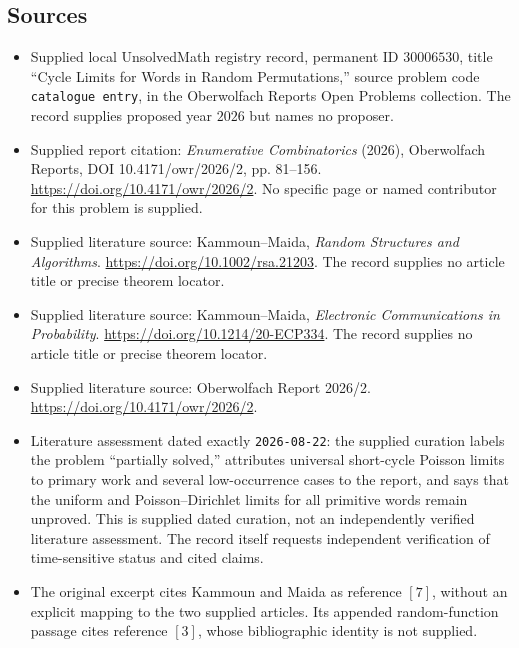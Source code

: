 \documentclass[11pt]{article}
\begin{document}
\subsection{Sources}
\begin{itemize}
\item Supplied local UnsolvedMath registry record, permanent ID \(30006530\), title ``Cycle Limits for Words in Random Permutations,'' source problem code \texttt{catalogue entry}, in the Oberwolfach Reports Open Problems collection. The record supplies proposed year \(2026\) but names no proposer.
\item Supplied report citation: \emph{Enumerative Combinatorics} (2026), Oberwolfach Reports, DOI 10.4171/owr/2026/2, pp. 81--156. \url{https://doi.org/10.4171/owr/2026/2}. No specific page or named contributor for this problem is supplied.
\item Supplied literature source: Kammoun--Maida, \emph{Random Structures and Algorithms}. \url{https://doi.org/10.1002/rsa.21203}. The record supplies no article title or precise theorem locator.
\item Supplied literature source: Kammoun--Maida, \emph{Electronic Communications in Probability}. \url{https://doi.org/10.1214/20-ECP334}. The record supplies no article title or precise theorem locator.
\item Supplied literature source: Oberwolfach Report 2026/2. \url{https://doi.org/10.4171/owr/2026/2}.
\item Literature assessment dated exactly \texttt{2026-08-22}: the supplied curation labels the problem ``partially solved,'' attributes universal short-cycle Poisson limits to primary work and several low-occurrence cases to the report, and says that the uniform and Poisson--Dirichlet limits for all primitive words remain unproved. This is supplied dated curation, not an independently verified literature assessment. The record itself requests independent verification of time-sensitive status and cited claims.
\item The original excerpt cites Kammoun and Maida as reference \([7]\), without an explicit mapping to the two supplied articles. Its appended random-function passage cites reference \([3]\), whose bibliographic identity is not supplied.
\end{itemize}
\end{document}
